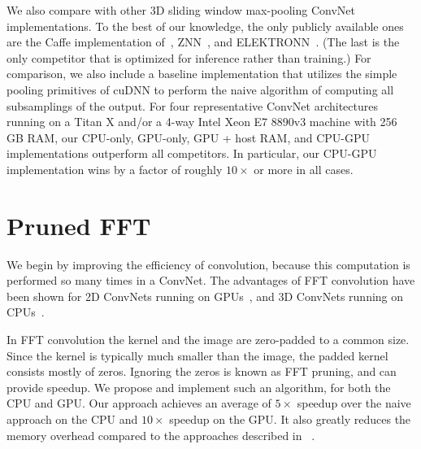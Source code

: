 \documentclass[conference]{./IEEEtran/IEEEtran}
\begin{document}
We also compare with other 3D sliding window max-pooling ConvNet
implementations.  To the best of our knowledge, the only publicly
available ones are the Caffe implementation
of~\cite{tschopp2015efficient}, ZNN~\cite{zlateski2015znn}, and
ELEKTRONN~\cite{ELEKTRONN2015}.  (The last is the only competitor that
is optimized for inference rather than training.) For comparison, we
also include a baseline implementation that utilizes the simple
pooling primitives of cuDNN to perform the naive algorithm of
computing all subsamplings of the output.  For four representative
ConvNet architectures running on a Titan X and/or a 4-way Intel Xeon
E7 8890v3 machine with 256 GB RAM, our CPU-only, GPU-only, GPU + host
RAM, and CPU-GPU implementations outperform all competitors.  In
particular, our CPU-GPU implementation wins by a factor of roughly
$10\times$ or more in all cases.



\section{Pruned FFT}
  We begin by improving the efficiency of convolution, because this
  computation is performed so many times in a ConvNet.  The advantages
  of FFT convolution have been shown for 2D ConvNets running on
  GPUs~\cite{mathieu-iclr-14,vasilache2014fast}, and 3D ConvNets
  running on CPUs~\cite{zlateski2015znn}.

  In FFT convolution the kernel and the image are zero-padded to a
  common size.  Since the kernel is typically much smaller than the
  image, the padded kernel consists mostly of zeros.  Ignoring the
  zeros is known as FFT pruning, and can provide speedup.  We propose
  and implement such an algorithm, for both the CPU and GPU. Our
  approach achieves an average of $5 \times$ speedup over the naive
  approach on the CPU and $10 \times$ speedup on the GPU.  It also
  greatly reduces the memory overhead compared to the approaches
  described in ~\cite{mathieu-iclr-14,vasilache2014fast}.
\end{document}
